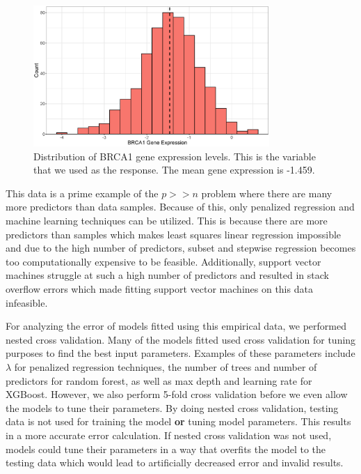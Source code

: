 \documentclass{article}
\begin{document}
\begin{figure}[h!]
	\centering
	\includegraphics[width = 0.8\textwidth]{images/empirical_histogram.eps}
	\captionsetup{width = 0.8\textwidth}
	\caption{Distribution of BRCA1 gene expression levels. This is the variable that we used as the response. The mean gene expression is -1.459.}
	\label{fig:BRCA1-distribution}
\end{figure}

This data is a prime example of the $p>>n$ problem where there are many more predictors than data samples. Because of this, only penalized regression and machine learning techniques can be utilized. This is because there are more predictors than samples which makes least squares linear regression impossible and due to the high number of predictors, subset and stepwise regression becomes too computationally expensive to be feasible. Additionally, support vector machines struggle at such a high number of predictors and resulted in stack overflow errors which made fitting support vector machines on this data infeasible.

For analyzing the error of models fitted using this empirical data, we performed nested cross validation. Many of the models fitted used cross validation for tuning purposes to find the best input parameters. Examples of these parameters include $\lambda$ for penalized regression techniques, the number of trees and number of predictors for random forest, as well as max depth and learning rate for XGBoost. However, we also perform 5-fold cross validation before we even allow the models to tune their parameters. By doing nested cross validation, testing data is not used for training the model \textbf{or} tuning model parameters. This results in a more accurate error calculation. If nested cross validation was not used, models could tune their parameters in a way that overfits the model to the testing data which would lead to artificially decreased error and invalid results.
\end{document}
